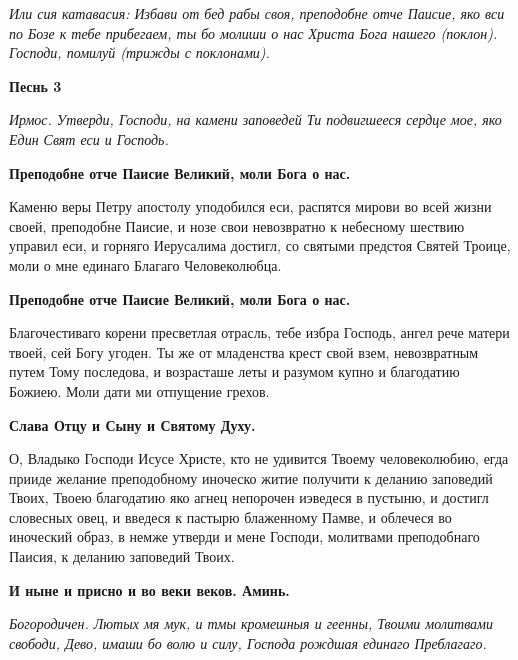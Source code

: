 \itshape Или сия катавасия:\normalfont{} Избави от бед рабы своя, преподобне отче Паисие, яко вси по Бозе к тебе прибегаем, ты бо молиши о нас Христа Бога нашего (\itshape поклон\normalfont{}). Господи, помилуй (\itshape трижды с поклонами\normalfont{}). 




\bfseries Песнь 3\normalfont{} 




\itshape Ирмос\normalfont{}. Утверди, Господи, на камени заповедей Ти подвигшееся сердце мое, яко Един Свят еси и Господь.




\bfseries Преподобне отче Паисие Великий, моли Бога о нас.\normalfont{} 




Каменю веры Петру апостолу уподобился еси, распятся мирови во всей жизни своей, преподобне Паисие, и нозе свои невозвратно к небесному шествию управил еси, и горняго Иерусалима достигл, со святыми предстоя Святей Троице, моли о мне единаго Благаго Человеколюбца. 




\bfseries Преподобне отче Паисие Великий, моли Бога о нас. \normalfont{}\nopagebreak


 Благочестиваго корени пресветлая отрасль, тебе избра Господь, ангел рече матери твоей, сей Богу угоден. Ты же от младенства крест свой взем, невозвратным путем Тому последова, и возрасташе леты и разумом купно и благодатию Божиею. Моли дати ми отпущение грехов. 




\bfseries Слава Отцу и Сыну и Святому Духу.\normalfont{} 




О, Владыко Господи Исусе Христе, кто не удивится Твоему человеколюбию, егда прииде желание преподобному иноческо житие получити к деланию
заповедий Твоих, Твоею благодатию яко агнец непорочен иэведеся в пустыню, и достигл словесных овец, и введеся к пастырю блаженному
Памве, и облечеся во иноческий образ, в немже утверди и мене Господи, молитвами преподобнаго Паисия, к деланию заповедий Твоих. 




\bfseries И ныне и присно и во веки веков. Аминь.\normalfont{} 




\itshape Богородичен.\normalfont{} Лютых мя мук, и тмы кромешныя и геенны, Твоими молитвами свободи, Дево, имаши бо волю и силу, Господа рождшая единаго Преблагаго. 




